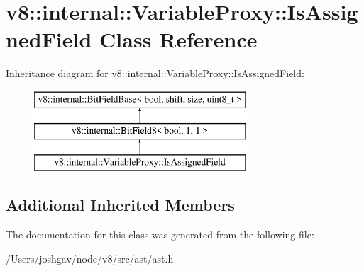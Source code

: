 \hypertarget{classv8_1_1internal_1_1_variable_proxy_1_1_is_assigned_field}{}\section{v8\+:\+:internal\+:\+:Variable\+Proxy\+:\+:Is\+Assigned\+Field Class Reference}
\label{classv8_1_1internal_1_1_variable_proxy_1_1_is_assigned_field}
Inheritance diagram for v8\+:\+:internal\+:\+:Variable\+Proxy\+:\+:Is\+Assigned\+Field\+:\begin{figure}[H]
\begin{center}
\leavevmode
\includegraphics[height=3.000000cm]{classv8_1_1internal_1_1_variable_proxy_1_1_is_assigned_field}
\end{center}
\end{figure}
\subsection*{Additional Inherited Members}


The documentation for this class was generated from the following file\+:\begin{DoxyCompactItemize}
\item 
/\+Users/joshgav/node/v8/src/ast/ast.\+h\end{DoxyCompactItemize}
